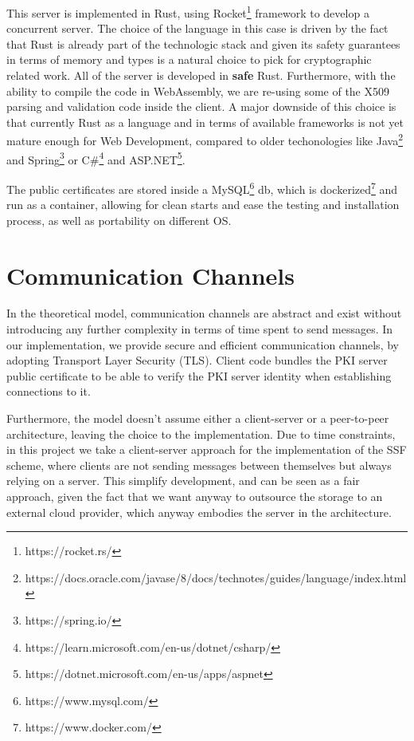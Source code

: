 This server is implemented in Rust, using Rocket\footnote{https://rocket.rs/} framework to develop a concurrent server.
The choice of the language in this case is driven by the fact that Rust is already part of the technologic stack and given its safety guarantees in terms of memory and types is a natural choice to pick for cryptographic related work.
All of the server is developed in \textbf{safe} Rust.
Furthermore, with the ability to compile the code in WebAssembly, we are re-using some of the X509 parsing and validation code inside the client.
A major downside of this choice is that currently Rust as a language and in terms of available frameworks is not yet mature enough for Web Development, compared to older techonologies like Java\footnote{https://docs.oracle.com/javase/8/docs/technotes/guides/language/index.html} and Spring\footnote{https://spring.io/} or C\#\footnote{https://learn.microsoft.com/en-us/dotnet/csharp/} and ASP.NET\footnote{https://dotnet.microsoft.com/en-us/apps/aspnet}.

The public certificates are stored inside a MySQL\footnote{https://www.mysql.com/} db, which is dockerized\footnote{https://www.docker.com/} and run as a container, allowing for clean starts and ease the testing and installation process, as well as portability on different OS.

\section{Communication Channels}

In the theoretical model, communication channels are abstract and exist without introducing any further complexity in terms of time spent to send messages.
In our implementation, we provide secure and efficient communication channels, by adopting Transport Layer Security (TLS).
Client code bundles the PKI server public certificate to be able to verify the PKI server identity when establishing connections to it.

Furthermore, the model doesn't assume either a client-server or a peer-to-peer architecture, leaving the choice to the implementation.
Due to time constraints, in this project we take a client-server approach for the implementation of the SSF scheme, where clients are not sending messages between themselves but always relying on a server.
This simplify development, and can be seen as a fair approach, given the fact that we want anyway to outsource the storage to an external cloud provider, which anyway embodies the server in the architecture.

